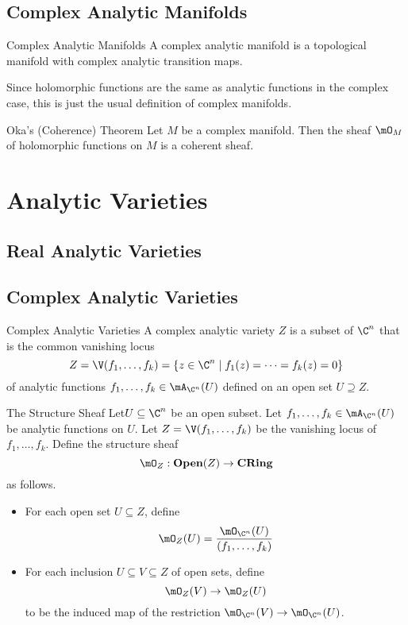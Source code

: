 \documentclass[a4paper]{article}
\begin{document}
\subsection{Complex Analytic Manifolds}
\begin{defn}{Complex Analytic Manifolds}{} A complex analytic manifold is a topological manifold with complex analytic transition maps. 
\end{defn}

Since holomorphic functions are the same as analytic functions in the complex case, this is just the usual definition of complex manifolds. 

\begin{thm}{Oka's (Coherence) Theorem}{} Let $M$ be a complex manifold. Then the sheaf $\mO_M$ of holomorphic functions on $M$ is a coherent sheaf. 
\end{thm}

\pagebreak
\section{Analytic Varieties}
\subsection{Real Analytic Varieties}

\subsection{Complex Analytic Varieties}
\begin{defn}{Complex Analytic Varieties}{} A complex analytic variety $Z$ is a subset of $\C^n$ that is the common vanishing locus $$Z=\V(f_1,\dots,f_k)=\left\{z\in\C^n\;|\;f_1(z)=\dots=f_k(z)=0\right\}$$ of analytic functions $f_1,\dots,f_k\in\mA_{\C^n}(U)$ defined on an open set $U\supseteq Z$. 
\end{defn}

\begin{defn}{The Structure Sheaf}{} Let$ U\subseteq\C^n$ be an open subset. Let $f_1,\dots,f_k\in\mA_{\C^n}(U)$ be analytic functions on $U$. Let $Z=\V(f_1,\dots,f_k)$ be the vanishing locus of $f_1,\dots,f_k$. Define the structure sheaf $$\mO_Z:\bold{Open}(Z)\to\bold{CRing}$$ as follows. 
\begin{itemize}
\item For each open set $U\subseteq Z$, define $$\mO_Z(U)=\frac{\mO_{\C^n}(U)}{(f_1,\dots,f_k)}$$
\item For each inclusion $U\subseteq V\subseteq Z$ of open sets, define $$\mO_Z(V)\to\mO_Z(U)$$ to be the induced map of the restriction $\mO_{\C^n}(V)\to\mO_{\C^n}(U)$. 
\end{itemize}
\end{defn}
\end{document}
